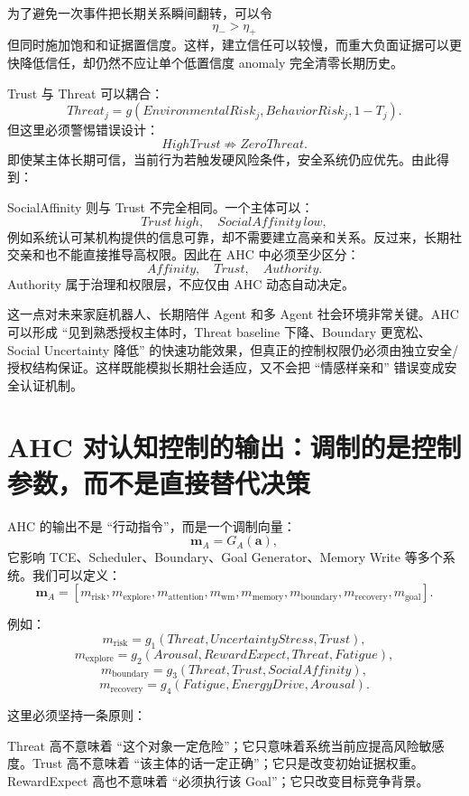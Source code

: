 为了避免一次事件把长期关系瞬间翻转，可以令
\[
\eta_-
>
\eta_+
\]
但同时施加饱和和证据置信度。这样，建立信任可以较慢，而重大负面证据可以更快降低信任，却仍然不应让单个低置信度 anomaly 完全清零长期历史。

Trust 与 Threat 可以耦合：
\[
Threat_j
=
g(
EnvironmentalRisk_j,
BehaviorRisk_j,
1-T_j
).
\]
但这里必须警惕错误设计：
\[
HighTrust
\nRightarrow
ZeroThreat.
\]
即使某主体长期可信，当前行为若触发硬风险条件，安全系统仍应优先。由此得到：
\begin{statementbox}
\centering
{}
\end{statementbox}

SocialAffinity 则与 Trust 不完全相同。一个主体可以：
\[
Trust\ high,\quad
SocialAffinity\ low,
\]
例如系统认可某机构提供的信息可靠，却不需要建立高亲和关系。反过来，长期社交亲和也不能直接推导高权限。因此在 AHC 中必须至少区分：
\[
Affinity,
\quad
Trust,
\quad
Authority.
\]
Authority 属于治理和权限层，不应仅由 AHC 动态自动决定。

这一点对未来家庭机器人、长期陪伴 Agent 和多 Agent 社会环境非常关键。AHC 可以形成 ``见到熟悉授权主体时，Threat baseline 下降、Boundary 更宽松、Social Uncertainty 降低'' 的快速功能效果，但真正的控制权限仍必须由独立安全/授权结构保证。这样既能模拟长期社会适应，又不会把 ``情感样亲和'' 错误变成安全认证机制。


\section{AHC 对认知控制的输出：调制的是控制参数，而不是直接替代决策}

AHC 的输出不是 ``行动指令''，而是一个调制向量：
\[
\mathbf m_A
=
G_A(\mathbf a),
\]
它影响 TCE、Scheduler、Boundary、Goal Generator、Memory Write 等多个系统。我们可以定义：
\[
\mathbf m_A
=
[
m_{\mathrm{risk}},
m_{\mathrm{explore}},
m_{\mathrm{attention}},
m_{\mathrm{wm}},
m_{\mathrm{memory}},
m_{\mathrm{boundary}},
m_{\mathrm{recovery}},
m_{\mathrm{goal}}
].
\]

例如：
\[
m_{\mathrm{risk}}
=
g_1(
Threat,
UncertaintyStress,
Trust
),
\]
\[
m_{\mathrm{explore}}
=
g_2(
Arousal,
RewardExpect,
Threat,
Fatigue
),
\]
\[
m_{\mathrm{boundary}}
=
g_3(
Threat,
Trust,
SocialAffinity
),
\]
\[
m_{\mathrm{recovery}}
=
g_4(
Fatigue,
EnergyDrive,
Arousal
).
\]

这里必须坚持一条原则：
\begin{statementbox}
\centering
{}
\end{statementbox}
Threat 高不意味着 ``这个对象一定危险''；它只意味着系统当前应提高风险敏感度。Trust 高不意味着 ``该主体的话一定正确''；它只是改变初始证据权重。RewardExpect 高也不意味着 ``必须执行该 Goal''；它只改变目标竞争背景。

